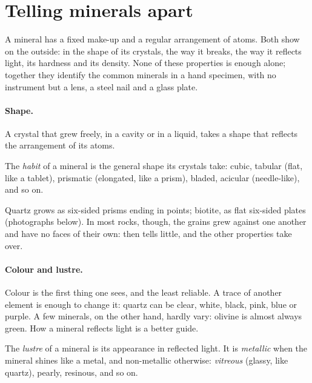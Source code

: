 \section{Telling minerals apart}

A mineral has a fixed make-up and a regular arrangement of atoms. Both show
on the outside: in the shape of its crystals, the way it breaks, the way it
reflects light, its hardness and its density. None of these properties is
enough alone; together they identify the common minerals in a hand specimen,
with no instrument but a lens, a steel nail and a glass plate.

\paragraph{Shape.} A crystal that grew freely, in a cavity or in a liquid,
takes a shape that reflects the arrangement of its atoms.

\begin{definition}[Habit]\label{def:g11:minerals:habit}
The \emph{habit} of a mineral is the general shape
its crystals take: cubic, tabular (flat, like a tablet), prismatic
(elongated, like a prism), bladed, acicular (needle-like), and so on.
\end{definition}

Quartz grows as six-sided prisms ending in points; biotite, as flat
six-sided plates (photographs below). In most rocks, though, the grains grew
against one another and have no faces of their own:  then tells little,
and the other properties take over.

\paragraph{Colour and lustre.} Colour is the first thing one sees, and the
least reliable. A trace of another element is enough to change it: quartz
can be clear, white, black, pink, blue or purple. A few minerals, on the
other hand, hardly vary: olivine is almost always green. How a mineral
reflects light is a better guide.

\begin{definition}[Lustre]\label{def:g11:minerals:lustre}
The \emph{lustre} of a mineral is its appearance in reflected
light. It is \emph{metallic} when the mineral shines like a metal, and
non-metallic otherwise: \emph{vitreous} (glassy, like quartz), pearly,
resinous, and so on.
\end{definition}

